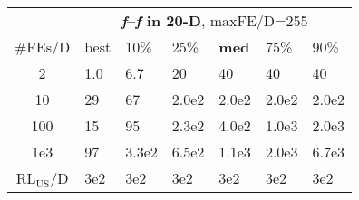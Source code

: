 \begin{tabular}{c|llllll}
 & \multicolumn{6}{|c}{\textbf{\textit{f}\raisebox{-0.35ex}{1}--\textit{f}\raisebox{-0.35ex}{55} in 20-D}, maxFE/D=255}\\
\#FEs/D & best & 10\% & 25\% & \textbf{med} & 75\% & 90\%\\
2 & \hspace*{1ex}1.0 & \hspace*{1ex}6.7 & 20 & 40 & 40 & 40\\
10 & 29 & 67 & 2.0e2 & 2.0e2 & 2.0e2 & 2.0e2\\
100 & 15 & 95 & 2.3e2 & 4.0e2 & 1.0e3 & 2.0e3\\
1e3 & 97 & 3.3e2 & 6.5e2 & 1.1e3 & 2.0e3 & 6.7e3\\
$\text{RL}_{\text{US}}$/D & 3e2 & 3e2 & 3e2 & 3e2 & 3e2 & 3e2
\end{tabular}
